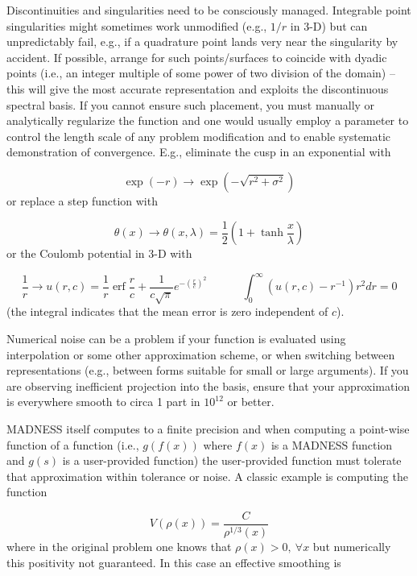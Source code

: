 Discontinuities and singularities need to be consciously managed. Integrable point singularities might sometimes work
unmodified (e.g.,  $1/r$ in 3-D) but can unpredictably fail, e.g., if a quadrature point lands very near the
singularity by accident. If possible, arrange for such points/surfaces to coincide with dyadic points (i.e., an integer
multiple of some power of two division of the domain) -- this will give the most accurate representation and exploits
the discontinuous spectral basis. If you cannot ensure such placement, you must manually or analytically regularize the
function and one would usually employ a parameter to control the length scale of any problem modification and to enable
systematic demonstration of convergence. E.g., eliminate the cusp in an exponential with

\begin{equation}
\exp (-r)\to \exp (-\sqrt{r^{2}+\sigma ^{2}})
\end{equation}
or replace a step function with 

\begin{equation}
\theta (x)\to \theta (x,\lambda )=\frac{1}{2}(1+\tanh \frac{x}{\lambda })
\end{equation}
or the Coulomb potential in 3-D with 

\begin{equation}
\frac{1}{r}\to u(r,c)=\frac{1}{r}\operatorname{erf}\frac{r}{c}+\frac{1}{c\sqrt{\pi
}}e^{-\left(\frac{r}{c}\right)^{2}}\ \ \ \ \ \ \ \ \ \ \ \ \ \ \int _{0}^{\infty
}\left(u(r,c)-r^{-1}\right)r^{2}\mathit{dr}=0
\end{equation}
(the integral indicates that the mean error is zero independent of  $c$).

Numerical noise can be a problem if your function is evaluated using interpolation or some other approximation scheme,
or when switching between representations (e.g., between forms suitable for small or large arguments). If you are
observing inefficient projection into the basis, ensure that your approximation is everywhere smooth to circa 1 part in
 $10^{12}$ or better.

MADNESS itself computes to a finite precision and when computing a point-wise function of a function (i.e.,  $g(f(x))$
where  $f(x)$ is a MADNESS function and  $g(s)$ is a user-provided function) the user-provided function must tolerate
that approximation within tolerance or noise. A classic example is computing the function

\begin{equation}
V(\rho (x))=\frac{C}{\rho ^{1/3}(x)}
\end{equation}
where in the original problem one knows that  $\rho (x)>0,\ \forall x$ but numerically this positivity not guaranteed.
In this case an effective smoothing is 

